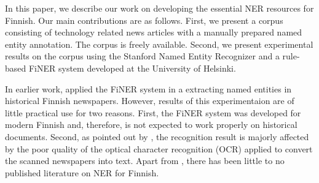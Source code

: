 \documentclass[11pt]{article}
\begin{document}


In this paper, we describe our work on developing the essential NER resources for Finnish. Our main contributions are as follows. First, we present a corpus consisting of technology related news articles with a manually prepared named entity annotation. The corpus is freely available. Second, we present experimental results on the corpus using the Stanford Named Entity Recognizer \citep{finkel2005} and a rule-based FiNER system developed at the University of Helsinki.

In earlier work, \citet{kettunen2016} applied the FiNER system in a extracting named entities in historical Finnish newspapers. However, results of this experimentaion are of little practical use for two reasons. First, the FiNER system was developed for modern Finnish and, therefore, is not expected to work properly on historical documents. Second, as pointed out by \citep{kettunen2016}, the recognition result is majorly affected by the poor quality of the optical character recognition (OCR) applied to convert the scanned newspapers into text. Apart from \citep{kettunen2016}, there has been little to no published literature on NER for Finnish.

\end{document}
